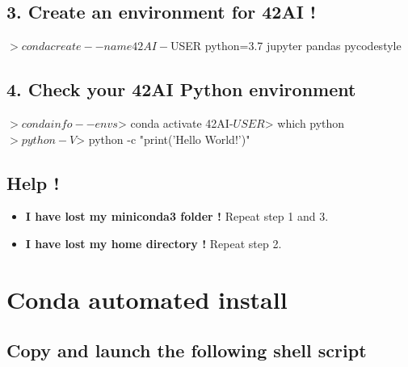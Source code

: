 \documentclass{42-en}
\begin{document}
\subsection*{3. Create an environment for 42AI !}
\begin{42console}
$> conda create --name 42AI-$USER python=3.7 jupyter pandas pycodestyle
\end{42console}

\subsection*{4. Check your 42AI Python environment}
\begin{42console}
$> conda info --envs
$> conda activate 42AI-$USER
$> which python
$> python -V
$> python -c "print('Hello World!')"
\end{42console}

\subsection*{Help !}
\begin{itemize}
	\item \textbf{I have lost my miniconda3 folder !} Repeat step 1 and 3.
	\item \textbf{I have lost my home directory !} Repeat step 2.
\end{itemize}


\newpage
\section*{Conda automated install}

\subsection*{Copy and launch the following shell script}
\end{document}
